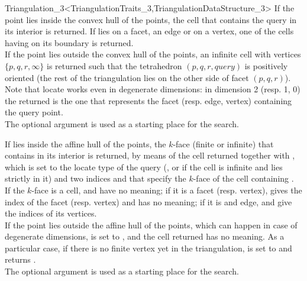 \begin{ccRefClass}{Triangulation_3<TriangulationTraits_3,TriangulationDataStructure_3>}
{
If the point  lies inside the convex hull of the points, the cell 
that contains the query in its interior is returned. If  lies on a
facet, an edge or on a vertex, one of the cells having  on
its boundary is returned.\\ 
If the point  lies outside the convex hull of the points,
an infinite cell with vertices $\{ p, q, r, \infty\}$ is returned such that
the tetrahedron $( p, q, r, query )$ is positively oriented
(the rest of the triangulation lies on the other side of facet 
$( p, q, r )$). \\
Note that locate works even in degenerate dimensions: in dimension 2
(resp. 1, 0) the  returned is the one that represents
the facet (resp. edge, vertex) containing the query point. \\
The optional argument  is used as a starting place for the search.
}

{If  lies inside the affine hull of the points, the $k$-face
(finite or infinite) that contains  in its interior is
returned, by means of the cell returned together with , which
is set to the locate type of the query (, or  if the cell is infinite and 
lies strictly in it) and two indices  and  that
specify the $k$-face of the cell containing .\\ 
If the $k$-face is a cell,  and  have no
meaning; if it is a facet (resp. vertex),  gives the index of
the facet (resp. vertex) and  has no meaning; if it is and
edge,  and  give the indices of its vertices.\\ 
If the point  lies outside the affine hull of the points,
which can happen in case of degenerate dimensions,  is set to
, and the cell returned has no meaning.
As a particular case, if there is no finite vertex yet in the
triangulation,  is set to  and
 returns . \\
The optional argument  is used as a starting place for the search.
}


\end{ccRefClass}
